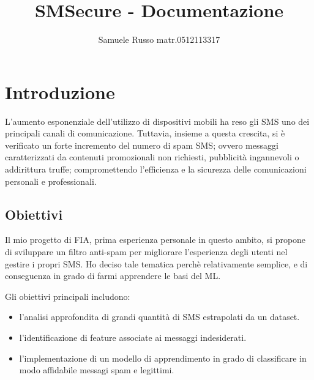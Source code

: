 \documentclass[]{article}
\title{SMSecure - Documentazione}
\author{Samuele Russo   matr.0512113317}
\begin{document}
\maketitle

\newpage

\tableofcontents

\newpage


\section{Introduzione}

    L'aumento esponenziale dell'utilizzo di dispositivi mobili ha reso gli SMS uno dei principali canali di comunicazione. Tuttavia, insieme a questa crescita, si è verificato un forte incremento del numero di spam SMS; ovvero messaggi caratterizzati da contenuti promozionali non richiesti, pubblicità ingannevoli o addirittura truffe; compromettendo l'efficienza e la sicurezza delle comunicazioni personali e professionali.


    \subsection{Obiettivi}

        Il mio progetto di FIA, prima esperienza personale in questo ambito, si propone di sviluppare un filtro anti-spam per migliorare l'esperienza degli utenti nel gestire i propri SMS. Ho deciso tale tematica perchè relativamente semplice, e di conseguenza in grado di farmi apprendere le basi del ML.

        Gli obiettivi principali includono:
        \begin{itemize}
            \item l'analisi approfondita di grandi quantità di SMS        estrapolati da un dataset.
            \item l'identificazione di feature associate ai               messaggi indesiderati.
            \item l'implementazione di un modello di apprendimento in grado di classificare in modo affidabile messagi spam e legittimi.
        \end{itemize}
\end{document}
